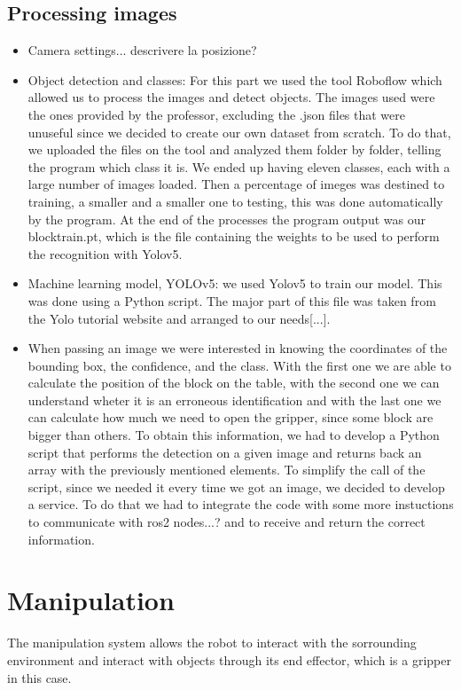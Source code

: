 \documentclass[12pt,a4paper]{article}
\begin{document}
\subsection{Processing images}\label{subsec:imageproc}
\begin{itemize}
    \item Camera settings... descrivere la posizione?
    \item Object detection and classes: For this part we used the tool Roboflow which allowed us to process the images and detect objects. The images used were the ones provided by the professor, excluding the .json files that were unuseful since we decided to create our own dataset from scratch. To do that, we uploaded the files on the tool and analyzed them folder by folder, telling the program which class it is. We ended up having eleven classes, each with a large number of images loaded. Then a percentage of imeges was destined to training, a smaller and a smaller one to testing, this was done automatically by the program. At the end of the processes the program output was our blocktrain.pt, which is the file containing the weights to be used to perform the recognition with Yolov5.
    \item Machine learning model, YOLOv5: we used Yolov5 to train our model. This was done using a Python script. The major part of this file was taken from the Yolo tutorial website and arranged to our needs[...]. 
    \item When passing an image we were interested in knowing the coordinates of the bounding box, the confidence, and the class. With the first one we are able to calculate the position of the block on the table, with the second one we can understand wheter it is an erroneous identification and with the last one we can calculate how much we need to open the gripper, since some block are bigger than others. To obtain this information, we had to develop a Python script that performs the detection on a given image and returns back an array with the previously mentioned elements. To simplify the call of the script, since we needed it every time we got an image, we decided to develop a service. To do that we had to integrate the code with some more instuctions to communicate with ros2 nodes...? and to receive and return the correct information.
\end{itemize}




\section{Manipulation}\label{sec:manipulation}
The manipulation system allows the robot to interact with the sorrounding environment and interact with objects through its end effector, which is a gripper in this case.
\end{document}
